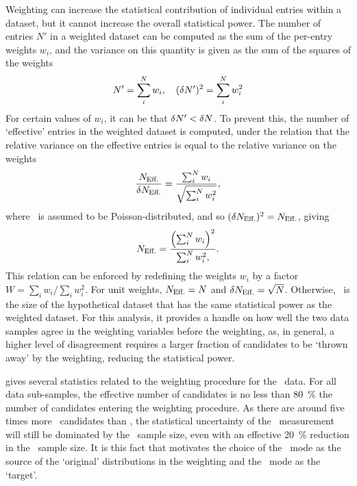 Weighting can increase the statistical contribution of individual entries
within a dataset, but it cannot increase the overall statistical power.
The number of entries $N'$ in a weighted dataset can be computed as the sum of
the per-entry weights $w_{i}$, and the variance on this quantity is given as
the sum of the squares of the weights
\begin{equation}
  N' = \sum_{i}^{N} w_{i},\quad (\delta{N'})^{2} = \sum_{i}^{N} w_{i}^{2}
\end{equation}
For certain values of $w_{i}$, it can be that $\delta{N'} < \delta{N}$.
To prevent this, the number of `effective' entries in the weighted dataset is
computed, under the relation that the relative variance on the effective
entries is equal to the relative variance on the weights
\begin{equation}
  \frac{N_{\text{Eff.}}}{\delta{\ensuremath{N_{\text{Eff.}}}}} =
    \frac{\sum_{i}^{N} w_{i}}{\sqrt{\sum_{i}^{N} w_{i}^{2}}},
\end{equation}
where \neff\ is assumed to be Poisson-distributed, and so $(\delta{\ensuremath{N_{\text{Eff.}}}})^{2} =
N_{\text{Eff.}}$, giving
\begin{equation}
  \neff = \frac{%
    {\left(\sum_{i}^{N}{w_{i}}\right)}^{2}
  }{%
    \sum_{i}^{N}{w_{i}^{2}},
  }.
  \label{eqn:cpv:kinematic_weighting:neff}
\end{equation}
This relation can be enforced by redefining the weights $w_{i}$ by a factor $W
= \sum_{i} w_{i}/\sum_{i} w_{i}^{2}$.
For unit weights, $N_{\text{Eff.}} = N$ and $\delta{\ensuremath{N_{\text{Eff.}}}} = \sqrt{N}$.
Otherwise, \neff\ is the size of the hypothetical dataset that has the same
statistical power as the weighted dataset.
For this analysis, it provides a handle on how well the two data samples agree
in the weighting variables before the weighting, as, in general, a higher level
of disagreement requires a larger fraction of candidates to be `thrown away' by
the weighting, reducing the statistical power.

 gives several statistics
related to the weighting procedure for the \ppipi\ data.
For all data sub-samples, the effective number of candidates is no less than
\SI{80}{\percent} the number of candidates entering the weighting procedure.
As there are around five times more \ppipi\ candidates than \pKK, the
statistical uncertainty of the \dACP\ measurement will still be dominated by
the \pKK\ sample size, even with an effective \SI{20}{\percent} reduction in
the \ppipi\ sample size.
It is this fact that motivates the choice of the \ppipi\ mode as the source of
the `original' distributions in the weighting and the \pKK\ mode as the
`target'.

